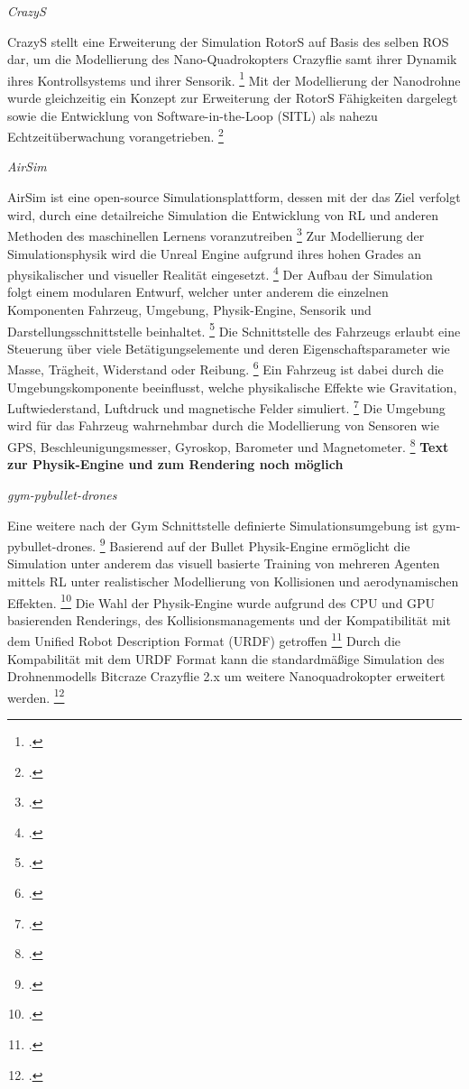 \textit{CrazyS}

CrazyS stellt eine Erweiterung der Simulation RotorS auf Basis des selben ROS dar, um die Modellierung des Nano-Quadrokopters Crazyflie samt ihrer Dynamik ihres Kontrollsystems und ihrer Sensorik. \footcite[Vgl.][S. 81]{Silano.2020}
Mit der Modellierung der Nanodrohne wurde gleichzeitig ein Konzept zur Erweiterung der RotorS Fähigkeiten dargelegt sowie die Entwicklung von Software-in-the-Loop (SITL) als nahezu Echtzeitüberwachung vorangetrieben. \footcite[Vgl.][S. 82]{Silano.2020}

\textit{AirSim}

AirSim ist eine open-source Simulationsplattform, dessen mit der das Ziel verfolgt wird, durch eine detailreiche Simulation die Entwicklung von RL und anderen Methoden des maschinellen Lernens voranzutreiben \footcite[Vgl.][S. 2]{Shah.2017}
Zur Modellierung der Simulationsphysik wird die Unreal Engine aufgrund ihres hohen Grades an physikalischer und visueller Realität eingesetzt. \footcite[Vgl.][S. 1]{Shah.2017}
Der Aufbau der Simulation folgt einem modularen Entwurf, welcher unter anderem die einzelnen Komponenten Fahrzeug, Umgebung, Physik-Engine, Sensorik und Darstellungsschnittstelle beinhaltet. \footcite[Vgl.][S. 3]{Shah.2017}
Die Schnittstelle des Fahrzeugs erlaubt eine Steuerung über viele Betätigungselemente und deren Eigenschaftsparameter wie Masse, Trägheit, Widerstand oder Reibung. \footcite[Vgl.][S. 5]{Shah.2017}
Ein Fahrzeug ist dabei durch die Umgebungskomponente beeinflusst, welche physikalische Effekte wie Gravitation, Luftwiederstand, Luftdruck und magnetische Felder simuliert. \footcite[Vgl.][S. 6]{Shah.2017}
Die Umgebung wird für das Fahrzeug wahrnehmbar durch die Modellierung von Sensoren wie GPS, Beschleunigungsmesser, Gyroskop, Barometer und Magnetometer. \footcite[Vgl.][S. 9]{Shah.2017}
\textbf{Text zur Physik-Engine und zum Rendering noch möglich}

\textit{gym-pybullet-drones}

Eine weitere nach der Gym Schnittstelle definierte Simulationsumgebung ist gym-pybullet-drones. \footcite[Vgl.][S. 1]{Panerati.332021}
Basierend auf der Bullet Physik-Engine ermöglicht die Simulation unter anderem das visuell basierte Training von mehreren Agenten mittels RL unter realistischer Modellierung von Kollisionen und aerodynamischen Effekten. \footcite[Vgl.][S. 1]{Panerati.332021}
Die Wahl der Physik-Engine wurde aufgrund des CPU und GPU basierenden Renderings, des Kollisionsmanagements und der Kompatibilität mit dem Unified Robot Description Format (URDF) getroffen \footcite[Vgl.][S. 3]{Panerati.332021}
Durch die Kompabilität mit dem URDF Format kann die standardmäßige Simulation des Drohnenmodells Bitcraze Crazyflie 2.x um weitere Nanoquadrokopter erweitert werden. \footcite[Vgl.][S. 3]{Panerati.332021}